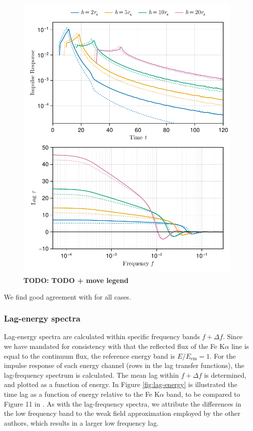 \documentclass[fleqn,usenatbib]{mnras}
\newcommand{\todo}[1]{{\noindent \bf \color{red} TODO: #1}}
\newcommand{\FeKa}{Fe K$\alpha$ }
\begin{document}
\begin{figure}
	\centering
	\includegraphics[width=0.98\linewidth]{figures/reverberation.thin-disc.pdf}
	\caption{\todo{TODO + move legend}}
	\label{fig:reverberation-thin}
\end{figure}

We find good agreement with \cite{cackett_modelling_2014} for all cases.

\subsubsection{Lag-energy spectra}

Lag-energy spectra are calculated within specific frequency bands $f + \Delta
f$. Since we have mandated for consistency with \cite{cackett_modelling_2014}
that the reflected flux of the \FeKa line is equal to the continuum flux,
the reference energy band is $E/E_\text{em} = 1$.  For the impulse response of
each energy channel (rows in the lag transfer functions), the lag-frequency
spectrum is calculated. The mean lag within $f + \Delta f$ is determined, and
plotted as a function of energy. In Figure \ref{fig:lag-energy} is illustrated
the time lag as a function of energy relative to the \FeKa band,
to be compared to Figure 11 in \cite{cackett_modelling_2014}. As with the
lag-frequency spectra, we attribute the differences in the low frequency band to
the weak field approximation employed by the other authors, which results in a
larger low frequency lag.
\end{document}
